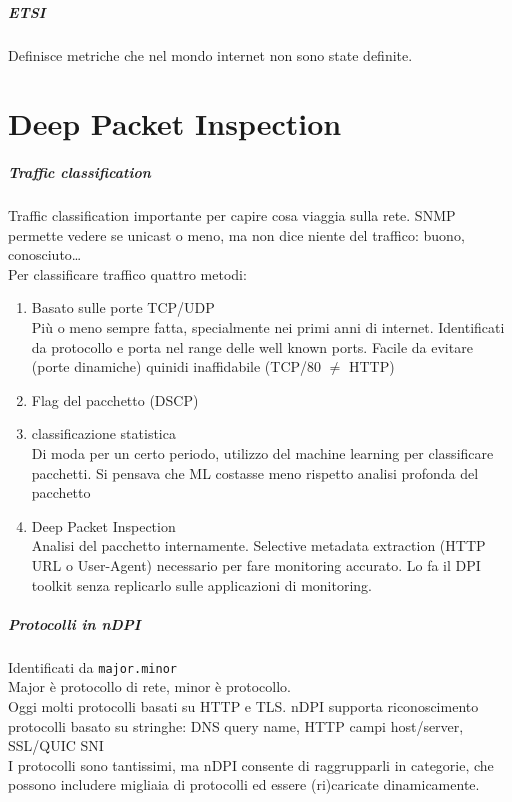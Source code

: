 \documentclass[10pt]{book}
\begin{document}
\paragraph{ETSI} Definisce metriche che nel mondo internet non sono state definite.\\
\chapter{Deep Packet Inspection}
\paragraph{Traffic classification} Traffic classification importante per capire cosa viaggia sulla rete. SNMP permette vedere se unicast o meno, ma non dice niente del traffico: buono, conosciuto\ldots\\
Per classificare traffico quattro metodi:
\begin{enumerate}
	\item Basato sulle porte TCP/UDP\\
	Più o meno sempre fatta, specialmente nei primi anni di internet. Identificati da protocollo e porta nel range delle well known ports. Facile da evitare (porte dinamiche) quinidi inaffidabile (TCP/80 $\neq$ HTTP)
	\item Flag del pacchetto (DSCP)\\
	
	\item classificazione statistica\\
	Di moda per un certo periodo, utilizzo del machine learning per classificare pacchetti. Si pensava che ML costasse meno rispetto analisi profonda del pacchetto
	\item Deep Packet Inspection\\
	Analisi del pacchetto internamente. Selective metadata extraction (HTTP URL o User-Agent) necessario per fare monitoring accurato. Lo fa il DPI toolkit senza replicarlo sulle applicazioni di monitoring.
\end{enumerate}
\paragraph{Protocolli in nDPI} Identificati da \texttt{major.minor}\\
Major è protocollo di rete, minor è protocollo.\\
Oggi molti protocolli basati su HTTP e TLS. nDPI supporta riconoscimento protocolli basato su stringhe: DNS query name, HTTP campi host/server, SSL/QUIC SNI\\
I protocolli sono tantissimi, ma nDPI consente di raggrupparli in categorie, che possono includere migliaia di protocolli ed essere (ri)caricate dinamicamente.
\end{document}

